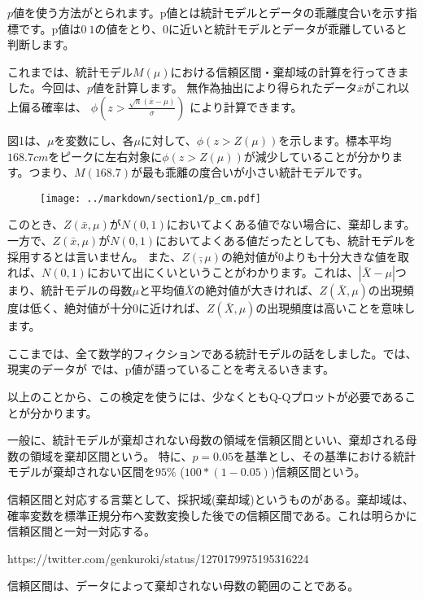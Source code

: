 \documentclass[a4paper,11pt,dvipdfmx]{jsarticle}
\begin{document}
$p$値を使う方法がとられます。p値とは統計モデルとデータの乖離度合いを示す指標です。p値は$0~1$の値をとり、$0$に近いと統計モデルとデータが乖離していると判断します。
\fi 

これまでは、統計モデル$M(\mu)$における信頼区間・棄却域の計算を行ってきました。今回は、$p$値を計算します。
無作為抽出により得られたデータ$\bar{x}$がこれ以上偏る確率は、
$\phi(z>\frac{\sqrt{n}(\bar{x}-\mu)}{\sigma})$
により計算できます。

図1は、$\mu$を変数にし、各$\mu$に対して、$\phi(z>Z(\mu))$を示します。標本平均$168.7cm$をピークに左右対象に$\phi(z>Z(\mu))$が減少していることが分かります。つまり、$M(168.7)$が最も乖離の度合いが小さい統計モデルです。
\begin{figure}
\begin{center}
   \texttt{[image: ../markdown/section1/p\_cm.pdf]}
 \end{center}
\end{figure}




このとき、$Z(\bar{x},\mu)$が$N(0,1)$においてよくある値でない場合に、棄却します。
一方で、$Z(\bar{x},\mu)$が$N(0,1)$においてよくある値だったとしても、統計モデルを採用するとは言いません。
また、$Z(\bar,\mu)$の絶対値が$0$よりも十分大きな値を取れば、$N(0,1)$において出にくいということがわかります。これは、$|\bar{X}-\mu|$つまり、統計モデルの母数$\mu$と平均値$\bar{X}$の絶対値が大きければ、$Z(\bar{X},\mu)$の出現頻度は低く、絶対値が十分$0$に近ければ、$Z(\bar{X},\mu)$の出現頻度は高いことを意味します。

ここまでは、全て数学的フィクションである統計モデルの話をしました。では、現実のデータが
では、p値が語っていることを考えるいきます。


以上のことから、この検定を使うには、少なくともQ-Qプロットが必要であることが分かります。


一般に、統計モデルが棄却されない母数の領域を信頼区間といい、棄却される母数の領域を棄却区間という。
特に、$p=0.05$を基準とし、その基準における統計モデルが棄却されない区間を$95\%$ ($100*(1-0.05)$)信頼区間という。


信頼区間と対応する言葉として、採択域(棄却域)というものがある。棄却域は、確率変数を標準正規分布へ変数変換した後での信頼区間である。これは明らかに信頼区間と一対一対応する。

https://twitter.com/genkuroki/status/1270179975195316224


信頼区間は、データによって棄却されない母数の範囲のことである。
\end{document}
